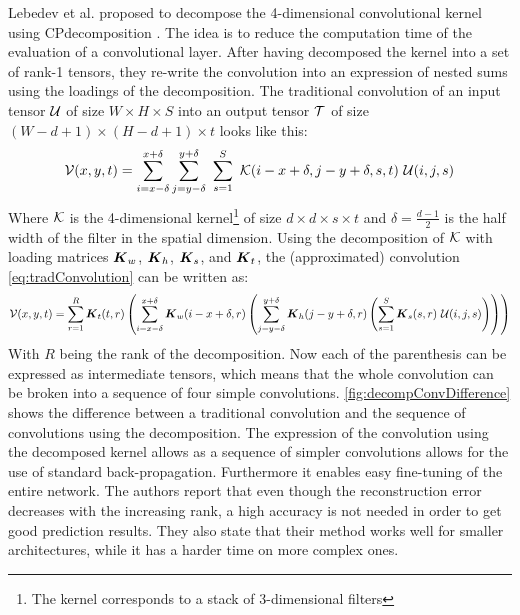 Lebedev et al. proposed to decompose the 4-dimensional convolutional kernel using CP\Hyphdash decomposition \cite{Lebedev2015}. The idea is to reduce the computation time of the evaluation of a convolutional layer. After having decomposed the kernel into a set of rank-1 tensors, they re-write the convolution into an expression of nested sums using the loadings of the decomposition. The traditional convolution of an input tensor $\mathcal{U}$ of size $W \times H \times S$ into an output tensor $\mathcal{T}$ of size $(W-d+1)\times (H-d+1)\times t$ looks like this:
\begin{equation}
    \tensor{V}(x, y, t)=\sum_{i=x-\delta}^{x+\delta} \sum_{j=y-\delta}^{y+\delta} \  \sum_{s=1}^{S} \ \tensor{K}(i-x+\delta, j-y+\delta, s, t) \ \tensor{U}(i, j, s)
    \label{eq:tradConvolution}
\end{equation}
Where $\mathcal{K}$ is the 4-dimensional kernel\footnote{The kernel corresponds to a stack of 3-dimensional filters} of size $d\times d \times s\times t$ and $\delta = \frac{d-1}{2}$ is the half width of the filter in the spatial dimension. Using the decomposition of $\mathcal{K}$ with loading matrices $\boldsymbol{K}_w$, $\boldsymbol{K}_h$, $\boldsymbol{K}_s$, and $\boldsymbol{K}_t$, the (approximated) convolution \eqref{eq:tradConvolution} can be written as:
\begin{equation}
    \tensor{V}(x, y, t) = \sum_{r=1}^{R} \bs{K}_{t}(t, r)\left(\sum_{i=x-\delta}^{x+\delta} \bs{K}_{w}(i-x+\delta, r)\left(\sum_{j=y-\delta}^{y+\delta} \bs{K}_{h}(j-y+\delta, r)\left(\sum_{s=1}^{S} \bs{K}_{s}(s, r) \ \tensor{U}(i, j, s)\right)\right)\right)
\end{equation}
With $R$ being the rank of the decomposition. Now each of the parenthesis can be expressed as intermediate tensors, which means that the whole convolution can be broken into a sequence of four simple convolutions. \autoref{fig:decompConvDifference} shows the difference between a traditional convolution and the sequence of convolutions using the decomposition. The expression of the convolution using the decomposed kernel allows as a sequence of simpler convolutions allows for the use of standard back-propagation. Furthermore it enables easy fine-tuning of the entire network. The authors report that even though the reconstruction error decreases with the increasing rank, a high accuracy is not needed in order to get good prediction results. They also state that their method works well for smaller architectures, while it has a harder time on more complex ones.

